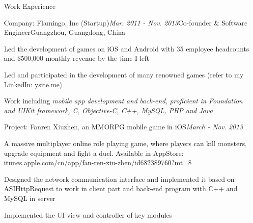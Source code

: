 \documentclass{resume} %
\begin{document}
\begin{rSection}{Work Experience}

\begin{rSubsection}{Company: Flamingo, Inc (Startup)}{\em Mar. 2011 - Nov. 2013}{Co-founder \& Software Engineer}{Guangzhou, Guangdong, China}
\item Led the development of games on iOS and Android with 35 employee headcounts and \$500,000 monthly revenue by the time I left
\item Led and participated in the development of many renowned games (refer to my LinkedIn: ysite.me)
\item Work including \textit{mobile app development and back-end, proficient in Foundation and UIKit framework, C, Objective-C, C++, MySQL, PHP and Java}
\end{rSubsection}


\begin{rSubsection}{Project: Fanren Xiuzhen, an MMORPG mobile game in iOS}{\em March - Nov. 2013}{}{}
\item A massive multiplayer online role playing game, where players can kill monsters, upgrade equipment and fight a duel. Available in AppStore: itunes.apple.com/cn/app/fan-ren-xiu-zhen/id682389760?mt=8
\item Designed the network communication interface and implemented it based on ASIHttpRequest to work in client part and back-end program with C++ and MySQL in server
\item Implemented the UI view and controller of key modules 
\end{rSubsection}


\end{rSection}
\end{document}
